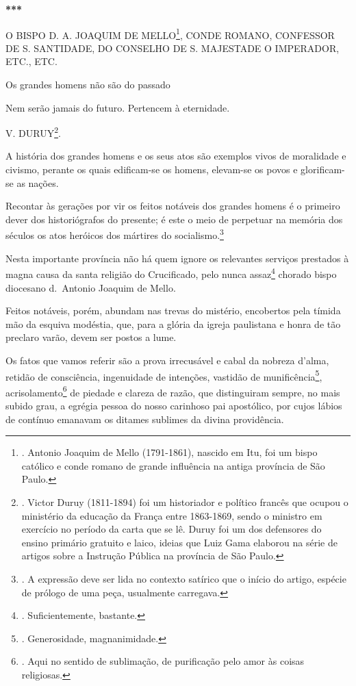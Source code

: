 \textbf{***}

O BISPO D. A. JOAQUIM DE MELLO\footnote{. Antonio Joaquim de Mello
  (1791-1861), nascido em Itu, foi um bispo católico e conde romano de
  grande influência na antiga província de São Paulo.}, CONDE ROMANO,
CONFESSOR DE S. SANTIDADE, DO CONSELHO DE S. MAJESTADE O IMPERADOR,
ETC., ETC.

Os grandes homens não são do passado

Nem serão jamais do futuro. Pertencem à eternidade.

V. DURUY\footnote{. Victor Duruy (1811-1894) foi um historiador e
  político francês que ocupou o ministério da educação da França entre
  1863-1869, sendo o ministro em exercício no período da carta que se
  lê. Duruy foi um dos defensores do ensino primário gratuito e laico,
  ideias que Luiz Gama elaborou na série de artigos sobre a Instrução
  Pública na província de São Paulo.}.

A história dos grandes homens e os seus atos são exemplos vivos de
moralidade e civismo, perante os quais edificam-se os homens, elevam-se
os povos e glorificam-se as nações.

Recontar às gerações por vir os feitos notáveis dos grandes homens é o
primeiro dever dos historiógrafos do presente; é este o meio de
perpetuar na memória dos séculos os atos heróicos dos mártires do
socialismo.\footnote{. A expressão deve ser lida no contexto satírico
  que o início do artigo, espécie de prólogo de uma peça, usualmente
  carregava.}

Nesta importante província não há quem ignore os relevantes serviços
prestados à magna causa da santa religião do Crucificado, pelo nunca
assaz\footnote{. Suficientemente, bastante.} chorado bispo diocesano
d.~Antonio Joaquim de Mello.

Feitos notáveis, porém, abundam nas trevas do mistério, encobertos pela
tímida mão da esquiva modéstia, que, para a glória da igreja paulistana
e honra de tão preclaro varão, devem ser postos a lume.

Os fatos que vamos referir são a prova irrecusável e cabal da nobreza
d'alma, retidão de consciência, ingenuidade de intenções, vastidão de
munificência\footnote{. Generosidade, magnanimidade.},
acrisolamento\footnote{. Aqui no sentido de sublimação, de purificação
  pelo amor às coisas religiosas.} de piedade e clareza de razão, que
distinguiram sempre, no mais subido grau, a egrégia pessoa do nosso
carinhoso pai apostólico, por cujos lábios de contínuo emanavam os
ditames sublimes da divina providência.


